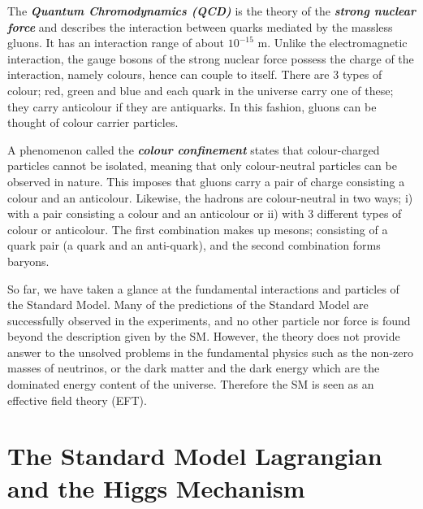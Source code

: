 The \textbf{\emph{Quantum Chromodynamics (QCD)}} is the theory of the \textbf{\textit{strong nuclear force}} and describes the interaction between quarks mediated by the massless gluons. It has an interaction range of about $10^{-15}$ m. Unlike the electromagnetic interaction, the gauge bosons of the strong nuclear force possess the charge of the interaction, namely colours, hence can couple to itself. There are 3 types of colour; red, green and blue and each quark in the universe carry one of these; they carry anticolour if they are antiquarks. In this fashion, gluons can be thought of colour carrier particles.

A phenomenon called the \textbf{\emph{colour confinement}} states that colour-charged particles cannot be isolated, meaning that only colour-neutral particles can be observed in nature\footnotemark. This imposes that gluons carry a pair of charge consisting a colour and an anticolour. Likewise, the hadrons are colour-neutral in two ways; i) with a pair consisting a colour and an anticolour or ii) with 3 different types of colour or anticolour. The first combination makes up mesons; consisting of a quark pair (a quark and an anti-quark), and the second combination forms baryons.


So far, we have taken a glance at the fundamental interactions and particles of the Standard Model. Many of the predictions of the Standard Model are successfully observed in the experiments, and no other particle nor force is found beyond the description given by the SM. However, the theory does not provide answer to the unsolved problems in the fundamental physics such as the non-zero masses of neutrinos\cite{neutrino-mass}, or the dark matter and the dark energy\cite{PlanckCol} which are the dominated energy content of the universe. Therefore the SM is seen as an effective field theory (EFT)\footnotemark.


\section{The Standard Model Lagrangian and the Higgs Mechanism}

